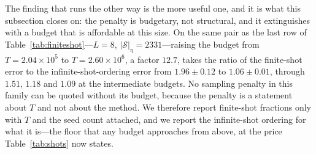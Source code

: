 The finding that runs the other way is the more useful one, and it is what this subsection closes on:
the penalty is budgetary, not structural, and it extinguishes with a budget that is affordable at this
size. On the same pair as the last row of Table~\ref{tab:finiteshot}---$L=8$,
$|\mathcal S|_\eta=2331$---raising the budget from $T=2.04\times10^{5}$ to $T=2.60\times10^{6}$, a
factor $12.7$, takes the ratio of the finite-shot error to the infinite-shot-ordering error from
$1.96\pm0.12$ to $1.06\pm0.01$, through $1.51$, $1.18$ and $1.09$ at the intermediate budgets. No
sampling penalty in this family can be quoted without its budget, because the penalty is a statement
about $T$ and not about the method. We therefore report finite-shot fractions only with $T$ and the
seed count attached, and we report the infinite-shot ordering for what it is---the floor that any
budget approaches from above, at the price Table~\ref{tab:shots} now states.
